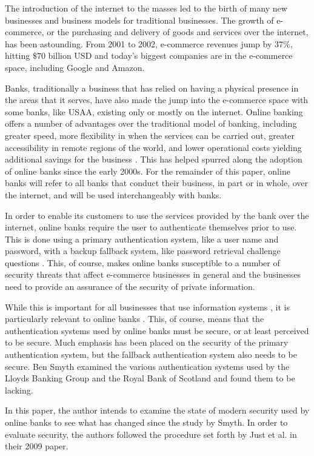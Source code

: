 \label{sec:background}

The introduction of the internet to the masses led to the birth of many new
businesses and business models for traditional businesses. The growth of
e-commerce, or the purchasing and delivery of goods and services over the
internet, has been astounding. From 2001 to 2002, e-commerce revenues jump by
$37\%$, hitting $\$70$ billion USD \cite{cheng2006adoption} and today's biggest
companies are in the e-commerce space, including Google and Amazon.

Banks, traditionally a business that has relied on having a physical presence 
in the areas that it serves, have also made the jump into the e-commerce 
space with some banks, like USAA, existing only or mostly on the internet. 
Online banking offers a number of advantages over the traditional model of
banking, including greater speed, more flexibility in when the services can be
carried out, greater accessibility in remote regions of the world, and lower
operational costs yielding additional savings for the business
\cite{oghenerukeybe2009customers}. This has helped spurred along the adoption of
online banks since the early 2000s. For the remainder of this paper, online
banks will refer to all banks that conduct their business, in part or in whole,
over the internet, and will be used interchangeably with banks.

In order to enable its customers to use the services provided by the bank over
the internet, online banks require the user to authenticate themselves prior to
use. This is done using a primary authentication system, like a user name and
password, with a backup fallback system, like password retrieval challenge
questions \cite{kleuckerfallback}. This, of course, makes online banks
susceptible to a number of security threats that affect e-commerce businesses in
general \cite{kleuckerfallback} and the businesses need to provide an assurance
of the security of private information.

While this is important for all 
businesses that use information systems \cite{suh2003effect} 
\cite{cheng2006adoption} \cite{oghenerukeybe2009customers}
\cite{aladwani2001online}, it is particularly relevant to online banks
\cite{oghenerukeybe2009customers}. This, of course, means that the
authentication systems used by online banks must be secure, or at least 
perceived to be secure. Much emphasis has been placed on the security of the
primary authentication system, but the fallback authentication system also
needs to be secure. Ben Smyth \cite{smyth2010forgotten} examined the
various authentication systems used by the Lloyds Banking Group and the Royal
Bank of Scotland and found them to be lacking.

In this paper, the author
intends to examine the state of modern security used by online banks to see
what has changed since the study by Smyth. In order to evaluate security,
the authors followed the procedure set forth by Just et al.
\cite{just2009personal} in their 2009 paper.